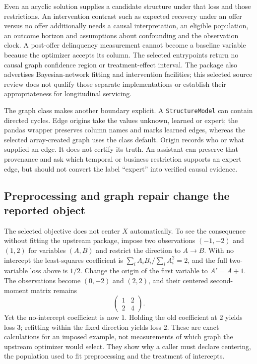 Even an acyclic solution supplies a candidate structure under that loss and
those restrictions. An intervention contrast such as expected recovery under
an offer versus no offer additionally needs a causal interpretation, an
eligible population, an outcome horizon and assumptions about confounding and
the observation clock. A post-offer delinquency measurement cannot become a
baseline variable because the optimizer accepts its column. The selected
entrypoints return no causal graph confidence region or treatment-effect
interval. The package also advertises Bayesian-network fitting and
intervention facilities; this selected source review does not qualify those
separate implementations or establish their appropriateness for longitudinal
servicing.~\citep{exec14_causalnex_primary}

The graph class makes another boundary explicit. A \texttt{StructureModel}
can contain directed cycles. Edge origins take the values unknown, learned
or expert; the pandas wrapper preserves column names and marks learned
edges, whereas the selected array-created graph uses the class default.
Origin records who or what supplied an edge. It does not certify its truth.
An assistant can preserve that provenance and ask which temporal or business
restriction supports an expert edge, but should not convert the label
``expert'' into verified causal evidence.~\citep{exec14_causalnex_primary}

\subsection{Preprocessing and graph repair change the reported object}

The selected objective does not center $X$ automatically. To see the
consequence without fitting the upstream package, impose two observations
$(-1,-2)$ and $(1,2)$ for variables $(A,B)$ and restrict the direction to
$A\to B$. With no intercept the least-squares coefficient is
$\sum_i A_iB_i/\sum_i A_i^2=2$, and the full two-variable loss above is $1/2$.
Change the origin of the first variable to $A'=A+1$. The observations become
$(0,-2)$ and $(2,2)$, and their centered second-moment matrix remains
\[
 \begin{pmatrix}1&2\\2&4\end{pmatrix}.
\]
Yet the no-intercept coefficient is now $1$. Holding the old coefficient at
$2$ yields loss $3$; refitting within the fixed direction yields loss $2$.
These are exact calculations for an imposed example, not measurements of
which graph the upstream optimizer would select. They show why a caller must
declare centering, the population used to fit preprocessing and the treatment
of intercepts.~\citep{exec14_causalnex_oracle}

